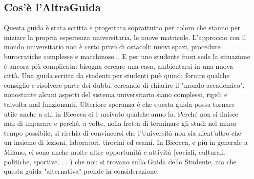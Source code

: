 
\subsection{Cos’è l’AltraGuida}
Questa guida è stata scritta e progettata soprattutto per coloro che stanno per iniziare la propria esperienza universitaria, le nuove matricole. L'approccio con il mondo universitario non è certo privo di ostacoli: nuovi spazi, procedure burocratiche complesse e macchinose... E per uno studente fuori sede la situazione è ancora più complicata: bisogna cercare una casa, ambientarsi in una nuova città.
Una guida scritta da studenti per studenti può quindi fornire qualche consiglio e risolvere parte dei dubbi, cercando di chiarire il "mondo accademico", nonostante alcuni aspetti del sistema universitario siano complessi, rigidi e talvolta mal funzionanti. Ulteriore speranza è che questa guida possa tornare utile anche a chi in Bicocca ci è arrivato qualche anno fa. Perché non si finisce mai di imparare e perché, a volte, nella fretta di terminare gli studi nel minor tempo possibile, si rischia di convincersi che l'Università non sia nient'altro che un insieme di lezioni, laboratori, tirocini ed esami. In Bicocca, e più in generale a Milano, ci sono anche molte altre opportunità e attività (sociali, culturali, politiche, sportive. . . ) che non si trovano sulla Guida dello Studente, ma che questa guida "alternativa" prende in considerazione.
 

